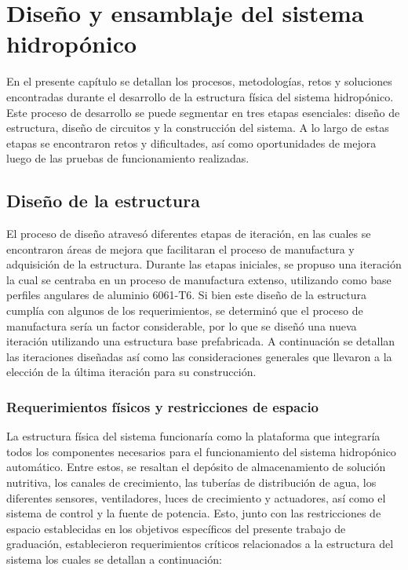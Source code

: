 

\chapter{Diseño y ensamblaje del sistema hidropónico}

En el presente capítulo se detallan los procesos, metodologías, retos y soluciones encontradas durante el desarrollo de la estructura física del sistema hidropónico. Este proceso de desarrollo se puede segmentar en tres etapas esenciales: diseño de estructura, diseño de circuitos y la construcción del sistema. A lo largo de estas etapas se encontraron retos y dificultades, así como oportunidades de mejora luego de las pruebas de funcionamiento realizadas.

\section{Diseño de la estructura}

El proceso de diseño atravesó diferentes etapas de iteración, en las cuales se encontraron áreas de mejora que facilitaran el proceso de manufactura y adquisición de la estructura. Durante las etapas iniciales, se propuso una iteración la cual se centraba en un proceso de manufactura extenso, utilizando como base perfiles angulares de aluminio 6061-T6. Si bien este diseño de la estructura cumplía con algunos de los requerimientos, se determinó que el proceso de manufactura sería un factor considerable, por lo que se diseñó una nueva iteración utilizando una estructura base prefabricada. A continuación se detallan las iteraciones diseñadas así como las consideraciones generales que llevaron a la elección de la última iteración para su construcción.

\subsection{Requerimientos físicos y restricciones de espacio}

La estructura física del sistema funcionaría como la plataforma que integraría todos los componentes necesarios para el funcionamiento del sistema hidropónico automático. Entre estos, se resaltan el depósito de almacenamiento de solución nutritiva, los canales de crecimiento, las tuberías de distribución de agua, los diferentes sensores, ventiladores, luces de crecimiento y actuadores, así como el sistema de control y la fuente de potencia. Esto, junto con las restricciones de espacio establecidas en los objetivos específicos del presente trabajo de graduación, establecieron requerimientos críticos relacionados a la estructura del sistema los cuales se detallan a continuación:

